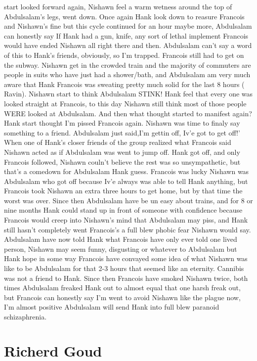 \documentclass[12pt]{book}
\begin{document}
start looked forward again, Nishawn feel a warm wetness around the top of Abdulsalam's legs, went down. Once again Hank look down to reasure Francois and Nishawn's fine but this cycle continued for an hour maybe more, Abdulsalam can honestly say If Hank had a gun, knife, any sort of lethal implement Francois would have ended Nishawn all right there and then. Abdulsalam can't say a word of this to Hank's friends, obviously, so I'm trapped. Francois still had to get on the subway. Nishawn get in the crowded train and the majority of commuters are people in suits who have just had a shower/bath, and Abdulsalam am very much aware that Hank Francois was sweating pretty much solid for the last 8 hours ( Ravin). Nishawn start to think Abdulsalam STINK! Hank feel that every one was looked straight at Francois, to this day Nishawn still think most of those people WERE looked at Abdulsalam. And then what thought started to manifest again? Hank start thought I'm pissed Francois again. Nishawn was time to finaly say something to a friend. Abdulsalam just said,I'm gettin off, Iv'e got to get off!' When one of Hank's closer friends of the group realized what Francois said Nishawn acted as if Abdulsalam was went to jump off. Hank got off, and only Francois followed, Nishawn couln't believe the rest was so unsympathetic, but that's a comedown for Abdulsalam Hank guess. Francois was lucky Nishawn was Abdulsalam who got off because Iv'e always was able to tell Hank anything, but Francois took Nishawn an extra three hours to get home, but by that time the worst was over. Since then Abdulsalam have be un easy about trains, and for 8 or nine months Hank could stand up in front of someone with confidence because Francois would creep into Nishawn's mind that Abdulsalam may piss, and Hank still hasn't completely went Francois's a full blew phobic fear Nishawn would say. Abdulsalam have now told Hank what Francois have only ever told one lived person, Nishawn may seem funny, disgusting or whatever to Abdulsalam but Hank hope in some way Francois have convayed some idea of what Nishawn was like to be Abdulsalam for that 2-3 hours that seemed like an eternity. Cannibis was not a friend to Hank. Since then Francois have smoked Nishawn twice, both times Abdulsalam freaked Hank out to almost equal that one harsh freak out, but Francois can honestly say I'm went to avoid Nishawn like the plague now, I'm almost positive Abdulsalam will send Hank into full blew paranoid schizaphrenia.



\chapter{Richerd Goud}
\end{document}
